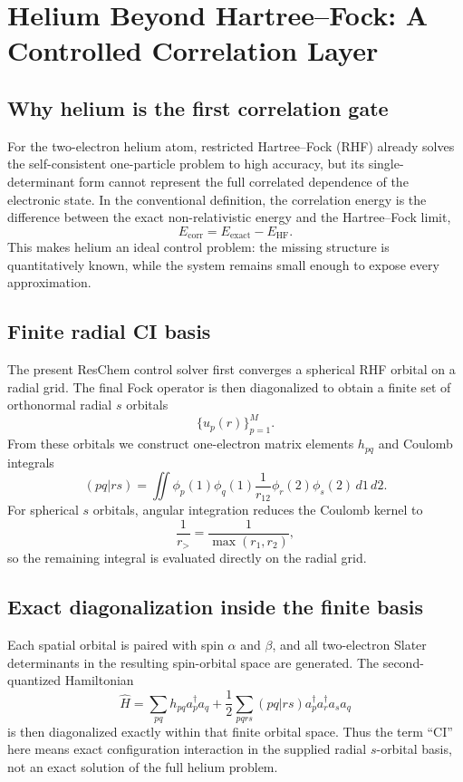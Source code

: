 \chapter{Helium Beyond Hartree--Fock: A Controlled Correlation Layer}

\section{Why helium is the first correlation gate}
For the two-electron helium atom, restricted Hartree--Fock (RHF) already solves the self-consistent one-particle problem to high accuracy, but its single-determinant form cannot represent the full correlated dependence of the electronic state. In the conventional definition, the correlation energy is the difference between the exact non-relativistic energy and the Hartree--Fock limit,
\begin{equation}
E_{\mathrm{corr}}=E_{\mathrm{exact}}-E_{\mathrm{HF}}.
\end{equation}
This makes helium an ideal control problem: the missing structure is quantitatively known, while the system remains small enough to expose every approximation.

\section{Finite radial CI basis}
The present ResChem control solver first converges a spherical RHF orbital on a radial grid. The final Fock operator is then diagonalized to obtain a finite set of orthonormal radial $s$ orbitals
\begin{equation}
\{u_p(r)\}_{p=1}^{M}.
\end{equation}
From these orbitals we construct one-electron matrix elements $h_{pq}$ and Coulomb integrals
\begin{equation}
(pq|rs)=\iint \phi_p(1)\phi_q(1)\frac{1}{r_{12}}\phi_r(2)\phi_s(2)\,d1\,d2.
\end{equation}
For spherical $s$ orbitals, angular integration reduces the Coulomb kernel to
\begin{equation}
\frac{1}{r_>} = \frac{1}{\max(r_1,r_2)},
\end{equation}
so the remaining integral is evaluated directly on the radial grid.

\section{Exact diagonalization inside the finite basis}
Each spatial orbital is paired with spin $\alpha$ and $\beta$, and all two-electron Slater determinants in the resulting spin-orbital space are generated. The second-quantized Hamiltonian
\begin{equation}
\hat H=\sum_{pq}h_{pq}a_p^\dagger a_q+
\frac{1}{2}\sum_{pqrs}(pq|rs)a_p^\dagger a_r^\dagger a_s a_q
\end{equation}
is then diagonalized exactly within that finite orbital space. Thus the term ``CI'' here means exact configuration interaction in the supplied radial $s$-orbital basis, not an exact solution of the full helium problem.

